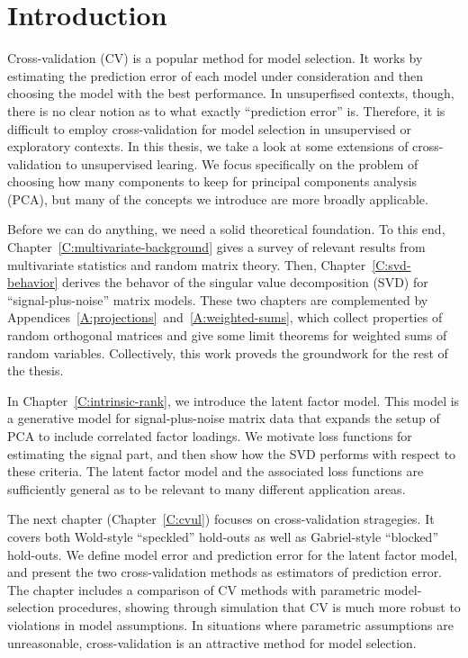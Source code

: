 \chapter{Introduction}

Cross-validation (CV) is a popular method for model selection.  It works by estimating the prediction error of each model under consideration and then choosing the model with the best performance.  In unsuperfised contexts, though, there is no clear notion as to what exactly ``prediction error'' is.  Therefore, it is difficult to employ cross-validation for model selection in unsupervised or exploratory contexts.  In this thesis, we take a look at some extensions of cross-validation to unsupervised learing.  We focus specifically on the problem of choosing how many components to keep for principal components analysis (PCA), but many of the concepts we introduce are more broadly applicable.

Before we can do anything, we need a solid theoretical foundation.  To this end, Chapter~\ref{C:multivariate-background} gives a survey of relevant results from multivariate statistics and random matrix theory.  Then, Chapter~\ref{C:svd-behavior} derives the behavor of the singular value decomposition (SVD) for ``signal-plus-noise'' matrix models.  These two chapters are complemented by Appendices~\ref{A:projections}~and~\ref{A:weighted-sums}, which collect properties of random orthogonal matrices and give some limit theorems for weighted sums of random variables.  Collectively, this work proveds the groundwork for the rest of the thesis.

In Chapter~\ref{C:intrinsic-rank}, we introduce the latent factor model.  This model is a generative model for signal-plus-noise matrix data that expands the setup of PCA to include correlated factor loadings.  We motivate loss functions for estimating the signal part, and then show how the SVD performs with respect to these criteria.  The latent factor model and the associated loss functions are sufficiently general as to be relevant to many different application areas.

The next chapter (Chapter~\ref{C:cvul}) focuses on cross-validation stragegies.  It covers both Wold-style ``speckled'' hold-outs as well as Gabriel-style ``blocked'' hold-outs.  We define model error and prediction error for the latent factor model, and present the two cross-validation methods as estimators of prediction error.  The chapter includes a comparison of CV methods with parametric model-selection procedures, showing through simulation that CV is much more robust to violations in model assumptions.  In situations where parametric assumptions are unreasonable, cross-validation is an attractive method for model selection.

